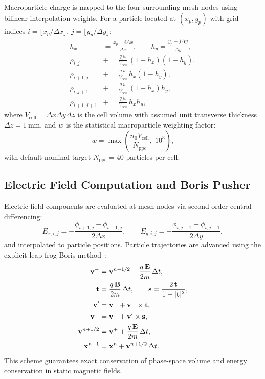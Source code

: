 \documentclass[11pt,a4paper]{article}
\begin{document}
Macroparticle charge is mapped to the four surrounding mesh nodes using bilinear interpolation weights. For a particle located at $(x_p, y_p)$ with grid indices $i = \lfloor x_p/\Delta x \rfloor$, $j = \lfloor y_p/\Delta y \rfloor$:
\begin{align}
    h_x &= \frac{x_p - i\Delta x}{\Delta x}, \qquad
    h_y = \frac{y_p - j\Delta y}{\Delta y},\\
    \rho_{i,j}     &\mathrel{+}= \frac{q_{\mathrm{i}} w}{V_{\mathrm{cell}}}\,(1-h_x)(1-h_y),\\
    \rho_{i+1,j}   &\mathrel{+}= \frac{q_{\mathrm{i}} w}{V_{\mathrm{cell}}}\,h_x(1-h_y),\\
    \rho_{i,j+1}   &\mathrel{+}= \frac{q_{\mathrm{i}} w}{V_{\mathrm{cell}}}\,(1-h_x)h_y,\\
    \rho_{i+1,j+1} &\mathrel{+}= \frac{q_{\mathrm{i}} w}{V_{\mathrm{cell}}}\,h_x h_y,
\end{align}
where $V_{\mathrm{cell}} = \Delta x \Delta y \Delta z$ is the cell volume with assumed unit transverse thickness $\Delta z = \SI{1}{\milli\meter}$, and $w$ is the statistical macroparticle weighting factor:
\begin{equation}
    w = \max\!\left(\frac{n_0 V_{\mathrm{cell}}}{N_{\mathrm{ppc}}},\; 10^{3}\right),
\end{equation}
with default nominal target $N_{\mathrm{ppc}} = 40$ particles per cell.

\subsection{Electric Field Computation and Boris Pusher}

Electric field components are evaluated at mesh nodes via second-order central differencing:
\begin{equation}
    E_{x,i,j} = -\frac{\phi_{i+1,j} - \phi_{i-1,j}}{2\Delta x}, \qquad
    E_{y,i,j} = -\frac{\phi_{i,j+1} - \phi_{i,j-1}}{2\Delta y},
\end{equation}
and interpolated to particle positions. Particle trajectories are advanced using the explicit leap-frog Boris method~\cite{birdsall}:
\begin{align}
    \vb{v}^{-} &= \vb{v}^{n-1/2} + \frac{q\,\vb{E}}{2m}\,\Delta t,\\
    \vb{t} &= \frac{q\,\vb{B}}{2m}\,\Delta t, \qquad
    \vb{s} = \frac{2\,\vb{t}}{1 + |\vb{t}|^2},\\
    \vb{v}' &= \vb{v}^{-} + \vb{v}^{-} \times \vb{t},\\
    \vb{v}^{+} &= \vb{v}^{-} + \vb{v}' \times \vb{s},\\
    \vb{v}^{n+1/2} &= \vb{v}^{+} + \frac{q\,\vb{E}}{2m}\,\Delta t,\\
    \vb{x}^{n+1} &= \vb{x}^{n} + \vb{v}^{n+1/2}\,\Delta t.
\end{align}
This scheme guarantees exact conservation of phase-space volume and energy conservation in static magnetic fields.
\end{document}
